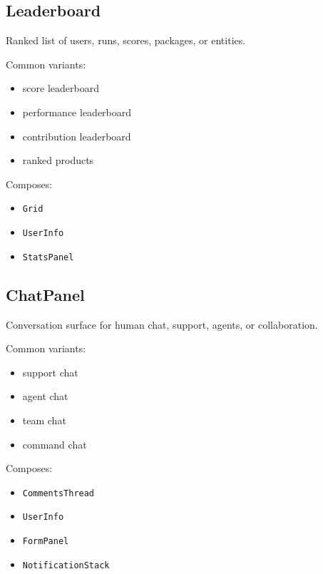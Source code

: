 \subsection{Leaderboard}\label{record-128-leaderboard}

Ranked list of users, runs, scores, packages, or entities.

Common variants:

\begin{itemize}
\tightlist
\item
  score leaderboard
\item
  performance leaderboard
\item
  contribution leaderboard
\item
  ranked products
\end{itemize}

Composes:

\begin{itemize}
\tightlist
\item
  \texttt{G\allowbreak{}r\allowbreak{}i\allowbreak{}d}
\item
  \texttt{U\allowbreak{}s\allowbreak{}e\allowbreak{}r\allowbreak{}I\allowbreak{}n\allowbreak{}f\allowbreak{}o}
\item
  \texttt{S\allowbreak{}t\allowbreak{}a\allowbreak{}t\allowbreak{}s\allowbreak{}P\allowbreak{}a\allowbreak{}n\allowbreak{}e\allowbreak{}l}
\end{itemize}

\subsection{ChatPanel}\label{record-128-chatpanel}

Conversation surface for human chat, support, agents, or collaboration.

Common variants:

\begin{itemize}
\tightlist
\item
  support chat
\item
  agent chat
\item
  team chat
\item
  command chat
\end{itemize}

Composes:

\begin{itemize}
\tightlist
\item
  \texttt{C\allowbreak{}o\allowbreak{}m\allowbreak{}m\allowbreak{}e\allowbreak{}n\allowbreak{}t\allowbreak{}s\allowbreak{}T\allowbreak{}h\allowbreak{}r\allowbreak{}e\allowbreak{}a\allowbreak{}d}
\item
  \texttt{U\allowbreak{}s\allowbreak{}e\allowbreak{}r\allowbreak{}I\allowbreak{}n\allowbreak{}f\allowbreak{}o}
\item
  \texttt{F\allowbreak{}o\allowbreak{}r\allowbreak{}m\allowbreak{}P\allowbreak{}a\allowbreak{}n\allowbreak{}e\allowbreak{}l}
\item
  \texttt{N\allowbreak{}o\allowbreak{}t\allowbreak{}i\allowbreak{}f\allowbreak{}i\allowbreak{}c\allowbreak{}a\allowbreak{}t\allowbreak{}i\allowbreak{}o\allowbreak{}n\allowbreak{}S\allowbreak{}t\allowbreak{}a\allowbreak{}c\allowbreak{}k}
\end{itemize}

